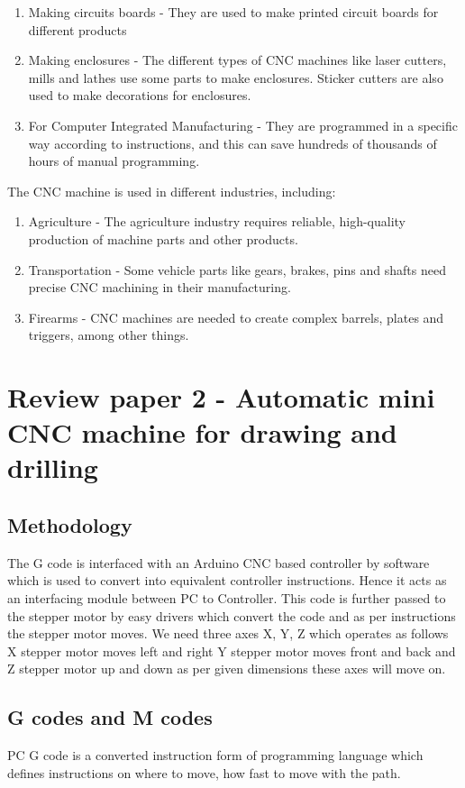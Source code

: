 \begin{enumerate}
 \item Making circuits boards - They are used to make printed circuit boards for different products
 \item Making enclosures - The different types of CNC machines like laser cutters, mills and lathes use some parts to make enclosures. Sticker cutters are also used to make decorations for enclosures.
 \item For Computer Integrated Manufacturing - They are programmed in a specific way according to instructions, and this can save hundreds of thousands of hours of manual programming.
\end{enumerate}

The CNC machine is used in different industries, including:

\begin{enumerate}
 \item Agriculture - The agriculture industry requires reliable, high-quality production of machine parts and other products.
 \item Transportation - Some vehicle parts like gears, brakes, pins and shafts need precise CNC machining in their manufacturing.
 \item Firearms - CNC machines are needed to create complex barrels, plates and triggers, among other things.
\end{enumerate}

\section{Review paper 2 - Automatic mini CNC machine for drawing and drilling}

\subsection{Methodology}
\cite{irjet_pap} The G code is interfaced with an Arduino CNC based controller by software which is used to convert into equivalent controller instructions. Hence it acts as an interfacing module between PC to Controller. This code is further passed to the stepper motor by easy drivers which convert the code and as per instructions the stepper motor moves. We need three axes X, Y, Z which operates as follows X stepper motor moves left and right Y stepper motor moves front and back and Z stepper motor up and down as per given dimensions these axes will move on.

\subsection{G codes and M codes}
PC G code is a converted instruction form of programming language which defines instructions on where to move, how fast to move with the path.


